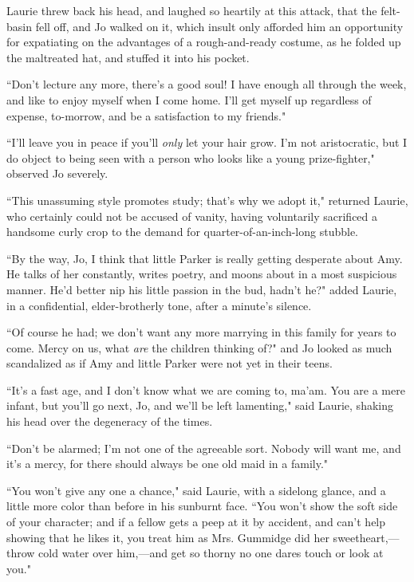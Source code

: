 Laurie threw back his head, and laughed so heartily at this attack, that
the felt-basin fell off, and Jo walked on it, which insult only afforded
him an opportunity for expatiating on the advantages of a
rough-and-ready costume, as he folded up the maltreated hat, and stuffed
it into his pocket.

``Don't lecture any more, there's a good
soul! I have enough all through the week, and like to enjoy myself when
I come home. I'll get myself up regardless of expense,
to-morrow, and be a satisfaction to my friends."

``I'll leave you in peace if you'll
\emph{only} let your hair grow. I'm not aristocratic,
but I do object to being seen with a person who looks like a young
prize-fighter," observed Jo severely.

``This unassuming style promotes study; that's why we
adopt it," returned Laurie, who certainly could not be accused of
vanity, having voluntarily sacrificed a handsome curly crop to the
demand for quarter-of-an-inch-long stubble.

``By the way, Jo, I think that little Parker is really getting desperate
about Amy. He talks of her constantly, writes poetry, and moons about in
a most suspicious manner. He'd better nip his little
passion in the bud, hadn't he?" added Laurie, in a
confidential, elder-brotherly tone, after a minute's
silence.

``Of course he had; we don't want any more marrying in
this family for years to come. Mercy on us, what \emph{are} the children
thinking of?" and Jo looked as much scandalized as if Amy and little
Parker were not yet in their teens.

``It's a fast age, and I don't know what
we are coming to, ma'am. You are a mere infant, but
you'll go next, Jo, and we'll be left
lamenting," said Laurie, shaking his head over the degeneracy of the
times.

``Don't be alarmed; I'm not one of the
agreeable sort. Nobody will want me, and it's a mercy,
for there should always be one old maid in a family."

``You won't give any one a chance," said Laurie, with a
sidelong glance, and a little more color than before in his sunburnt
face. ``You won't show the soft side of your character;
and if a fellow gets a peep at it by accident, and can't
help showing that he likes it, you treat him as Mrs. Gummidge did her
sweetheart,---throw cold water over him,---and get so thorny no one
dares touch or look at you."

